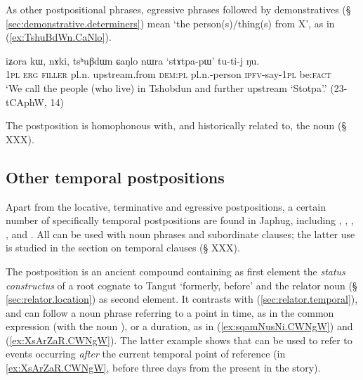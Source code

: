 As other postpositional phrases, egressive phrases followed by demonstratives (§ \ref{sec:demonstrative.determiners}) mean `the person(s)/thing(s) from X', as in (\ref{ex:TshuBdWn.CaNlo}).

 \begin{exe}
\ex \label{ex:TshuBdWn.CaNlo}
 \gll iʑora kɯ, nɤki, tsʰuβdɯn ɕaŋlo nɯra `stɤtpa-pɯ' tu-ti-j ŋu. \\
 \textsc{1pl} \textsc{erg} \textsc{filler} pl.n. upstream.from \textsc{dem}:\textsc{pl} pl.n.-person \textsc{ipfv}-say-\textsc{1pl} be:\textsc{fact} \\
\glt `We call the people (who live) in Tshobdun and further upstream `Stotpa'.' (23-tCAphW, 14)
\end{exe}

The postposition  is homophonous with, and historically related to, the noun  (§ XXX).
 
 \subsection{Other temporal postpositions} \label{sec:temporal.postpositions}
Apart from the locative, terminative and egressive postpositions, a certain number of specifically temporal postpositions are found in Japhug, including ,  , , ,  and . All can be used with noun phrases and subordinate clauses; the latter use is studied in the section on temporal clauses (§ XXX).

The postposition   is an ancient compound containing as first element the \textit{status constructus} of a root cognate to Tangut  `formerly, before' and the relator noun  (§ \ref{sec:relator.location}) as second element. It contrasts with   (\ref{sec:relator.temporal}), and can follow a noun phrase referring to a point in time, as in the common expression  (with the noun  ), or a duration, as in (\ref{ex:sqamNusNi.CWNgW}) and (\ref{ex:XsArZaR.CWNgW}). The latter example shows that  can be used to refer to events occurring \textit{after} the current temporal point of reference (in \ref{ex:XsArZaR.CWNgW}, before three days from the present in the story).

